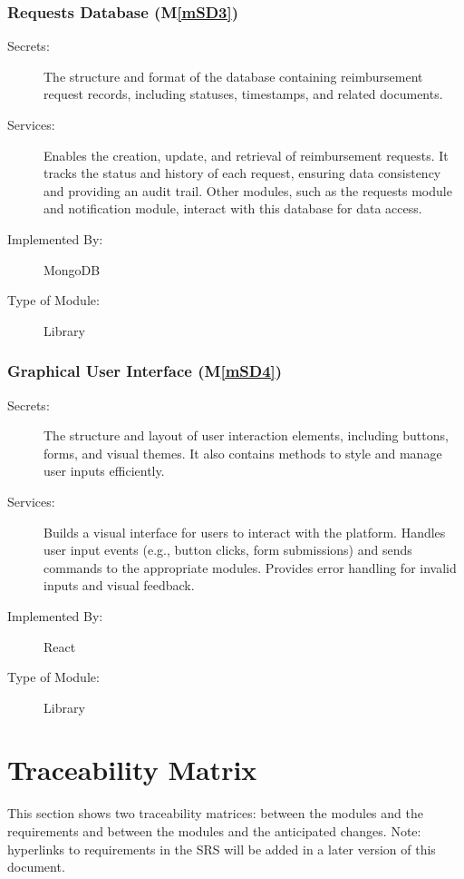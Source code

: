 \documentclass[12pt, titlepage]{article}
\newcommand{\mref}[1]{M\ref{#1}}
\begin{document}
\subsubsection{Requests Database (\mref{mSD3})}

\begin{description}
\item[Secrets:] The structure and format of the database containing reimbursement request records, including statuses, timestamps, and related documents.
\item[Services:] Enables the creation, update, and retrieval of reimbursement requests. It tracks the status and history of each request, ensuring data consistency and providing an audit trail. Other modules, such as the requests module and notification module, interact with this database for data access.
\item[Implemented By:] MongoDB
\item[Type of Module:] Library
\end{description}

\subsubsection{Graphical User Interface (\mref{mSD4})}

\begin{description}
\item[Secrets:] The structure and layout of user interaction elements, including buttons, forms, and visual themes. It also contains methods to style and manage user inputs efficiently.
\item[Services:] Builds a visual interface for users to interact with the platform. Handles user input events (e.g., button clicks, form submissions) and sends commands to the appropriate modules. Provides error handling for invalid inputs and visual feedback.
\item[Implemented By:] React
\item[Type of Module:] Library
\end{description}


\section{Traceability Matrix} \label{SecTM}

This section shows two traceability matrices: between the modules and the
requirements and between the modules and the anticipated changes. Note: hyperlinks to requirements in the SRS will be added in a later version of this document.
\end{document}

